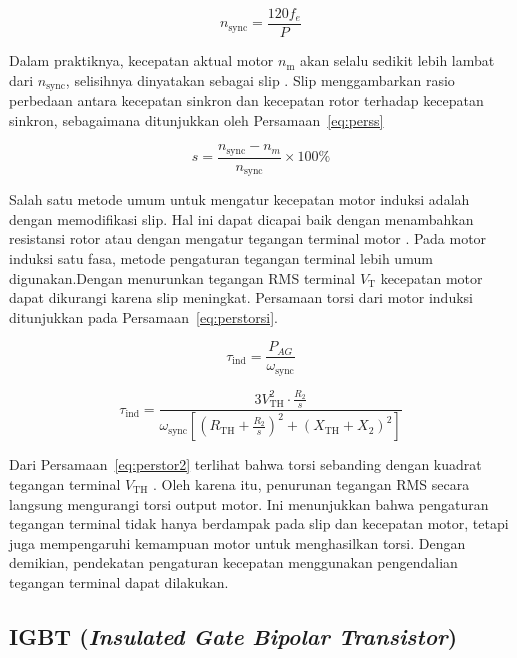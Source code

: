 \begin{equation}
\label{eq:Persamaandas}
n_{\text{sync}} = \frac{120 f_e}{P}
\end{equation}

Dalam praktiknya, kecepatan aktual motor $n_{\text{m}}$ akan selalu sedikit lebih lambat
dari $n_{\text{sync}}$, selisihnya dinyatakan sebagai slip . Slip menggambarkan
rasio perbedaan antara kecepatan sinkron dan kecepatan rotor terhadap kecepatan sinkron,
sebagaimana ditunjukkan oleh Persamaan~\eqref{eq:perss}

\begin{equation}
\label{eq:perss}
s = \frac{n_{\text{sync}} - n_m}{n_{\text{sync}}} \times 100\%
\end{equation}

Salah satu metode umum untuk mengatur kecepatan motor induksi adalah dengan memodifikasi
slip. Hal ini dapat dicapai baik dengan menambahkan resistansi rotor atau dengan
mengatur tegangan terminal motor \parencite{chapman}. Pada motor induksi satu fasa,
metode pengaturan tegangan terminal lebih umum digunakan.Dengan menurunkan tegangan RMS
terminal $V_{\text{T}}$ kecepatan motor dapat dikurangi karena slip meningkat. Persamaan
torsi dari motor induksi ditunjukkan pada Persamaan~\eqref{eq:perstorsi}.

\begin{equation}
\label{eq:perstorsi}
\tau_{\text{ind}} = \frac{P_{AG}}{\omega_{\text{sync}}}
\end{equation}

\begin{equation}
\label{eq:perstor2}
\tau_{\text{ind}} = 
\frac{3V_{\text{TH}}^2 \cdot \frac{R_2}{s}}{
\omega_{\text{sync}} \left[ \left( R_{\text{TH}} + \frac{R_2}{s} \right)^2 + (X_{\text{TH}} + X_2)^2 \right]}
\end{equation}

Dari Persamaan~\eqref{eq:perstor2} terlihat bahwa torsi sebanding dengan kuadrat tegangan
terminal $V_{\text{TH}}$ \parencite{hart}. Oleh karena itu, penurunan tegangan RMS
secara langsung mengurangi torsi output motor. Ini menunjukkan bahwa pengaturan tegangan
terminal tidak hanya berdampak pada slip dan kecepatan motor, tetapi juga mempengaruhi
kemampuan motor untuk menghasilkan torsi. Dengan demikian, pendekatan pengaturan
kecepatan menggunakan pengendalian tegangan terminal dapat dilakukan.

\subsection{IGBT (\emph{Insulated Gate Bipolar Transistor})}

